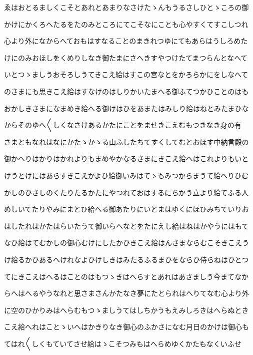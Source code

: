 \documentclass[a4paper,11pt,landscape]{ltjtarticle}
\begin{document}
\par\medskip
ゑはおとるましくこそとあれとあまりなさけたゝんもうるさしひとゝころの御
\par\medskip
かけにかくろへたるをたのみところにてこそなにことも心やすくてすこしつれ
\par\medskip
心より外になからへておもはすなることのまきれつゆにてもあらはうしろめた
\par\medskip
けにのみおほしをくめりしなき御たまにさへきすやつけたてまつらんとなへて
\par\medskip
いとつゝましうおそろしうてきこえ給はすこの宮なとをかろらかにをしなへて
\par\medskip
のさまにも思きこえ給はすなけのはしりかいたまへる御ふてつかひことのはも
\par\medskip
おかしきさまになまめき給へる御けはひをあまたはみしり給はねとみたまひな
\par\medskip
からそのゆへ〱しくなさけあるかたにことをませきこえむもつきなき身の有
\par\medskip
さまともなれはなにかたゝかゝる山ふしたちてすくしてむとおほす中納言殿の
\par\medskip
御かへりはかりはかれよりもまめやかなるさまにきこえ給へはこれよりもいと
\par\medskip
けうとけにはあらすきこえかよひ給御いみはてゝもみつからまうて給へりひむ
\par\medskip
かしのひさしのくたりたるかたにやつれておはするにちかう立より給てふる人
\par\medskip
めしいてたりやみにまとひ給へる御あたりにいとまはゆくにほひみちていりお
\par\medskip
はしたれはかたはらいたうて御いらへなとをたにえし給はねはかやうにはもて
\par\medskip
なひ給はてむかしの御心むけにしたかひきこえ給はんさまならむこそきこえう
\par\medskip
け給るかひあるへけれなよひけしきはみたるふるまひをならひ侍らねはひとつ
\par\medskip
てにきこえはへるはことのはもつゝきはへらすとあれはあさましう今まてなか
\par\medskip
らへはへるやうなれと思さまさんかたなき夢にたとられはへりてなむ心より外
\par\medskip
に空のひかりみはへらむもつゝましうてはしちかうもえみしろきはへらぬとき
\par\medskip
こえ給へれはことゝいへはかきりなき御心のふかさになむ月日のかけは御心も
\par\medskip
てはれ〱しくもていてさせ給はゝこそつみもはへらめゆくかたもなくいふせ
\end{document}
